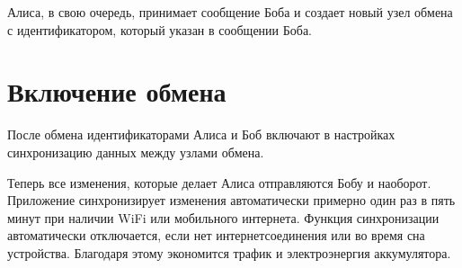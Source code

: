 \documentclass[a4paper,10pt,russian]{sphinxmanual}
\begin{document}
\noindent{}

\noindent{}

\noindent{}

\sphinxAtStartPar
Алиса, в свою очередь, принимает сообщение Боба и создает новый узел обмена с идентификатором, который указан в сообщении Боба.


\section{Включение обмена}
\label{\detokenize{teamwork:id6}}
\sphinxAtStartPar
После обмена идентификаторами Алиса и Боб включают в настройках синхронизацию данных между узлами обмена.

\noindent{}

\noindent{}

\noindent{}

\noindent{}

\sphinxAtStartPar
Теперь все изменения, которые делает Алиса отправляются Бобу и наоборот. Приложение синхронизирует изменения
автоматически примерно один раз в пять минут при наличии Wi\sphinxhyphen{}Fi или мобильного интернета. Функция синхронизации
автоматически отключается, если нет интернет\sphinxhyphen{}соединения или во время сна устройства. Благодаря этому
экономится трафик и электроэнергия аккумулятора.
\end{document}
